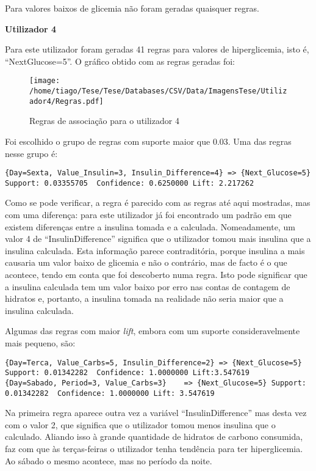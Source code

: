 Para valores baixos de glicemia não foram geradas quaisquer regras.


\textbf{Utilizador 4}

Para este utilizador foram geradas 41 regras para valores de hiperglicemia, isto é, ``Next\textunderscore Glucose=5''. O gráfico obtido com as regras geradas foi:

\begin{figure}[H]
\centering
\texttt{[image: /home/tiago/Tese/Tese/Databases/CSV/Data/ImagensTese/Utilizador4/Regras.pdf]}
\caption{Regras de associação para o utilizador 4}
\end{figure}
Foi escolhido o grupo de regras com suporte maior que 0.03. Uma das regras nesse grupo é:
 
\begin{lstlisting}
{Day=Sexta, Value_Insulin=3, Insulin_Difference=4} => {Next_Glucose=5} Support: 0.03355705  Confidence: 0.6250000 Lift: 2.217262
\end{lstlisting}
Como se pode verificar, a regra é parecido com as regras até aqui mostradas, mas com uma diferença: para este utilizador já foi encontrado um padrão em que existem diferenças entre a insulina tomada e a calculada. Nomeadamente, um valor 4 de ``Insulin\textunderscore Difference'' significa que o utilizador tomou mais insulina que a insulina calculada. Esta informação parece contraditória, porque insulina a mais causaria um valor baixo de glicemia e não o contrário, mas de facto é o que acontece, tendo em conta que foi descoberto numa regra. Isto pode significar que a insulina calculada tem um valor baixo por erro nas contas de contagem de hidratos e, portanto, a insulina tomada na realidade não seria maior que a insulina calculada.

Algumas das regras com maior \textit{lift}, embora com um suporte consideravelmente mais pequeno, são:

\begin{lstlisting}
{Day=Terca, Value_Carbs=5, Insulin_Difference=2} => {Next_Glucose=5} Support: 0.01342282  Confidence: 1.0000000 Lift:3.547619
{Day=Sabado, Period=3, Value_Carbs=3}    => {Next_Glucose=5} Support: 0.01342282  Confidence: 1.0000000 Lift: 3.547619
\end{lstlisting}
Na primeira regra aparece outra vez a variável ``Insulin\textunderscore Difference'' mas desta vez com o valor 2, que significa que o utilizador tomou menos insulina que o calculado. Aliando isso à grande quantidade de hidratos de carbono consumida, faz com que às terças-feiras o utilizador tenha tendência para ter hiperglicemia. Ao sábado o mesmo acontece, mas no período da noite.


